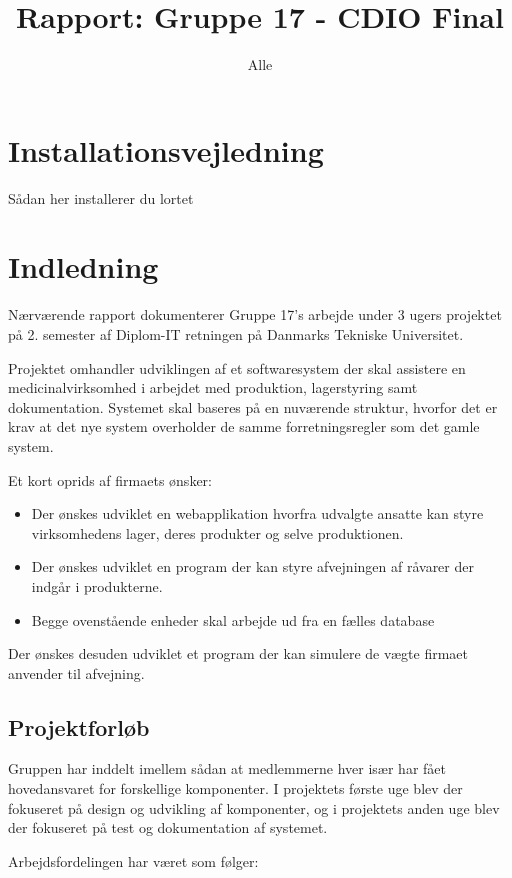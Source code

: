 \documentclass[a4paper]{article}
\title{Rapport: Gruppe 17 - CDIO Final}
\author{
  Alle
}
\begin{document}
\section*{Installationsvejledning} %

Sådan her installerer du lortet


\tableofcontents
\clearpage

\section{Indledning} %

Nærværende rapport dokumenterer Gruppe 17's arbejde under 3 ugers projektet på 2. semester af Diplom-IT retningen på Danmarks Tekniske Universitet.

Projektet omhandler udviklingen af et softwaresystem der skal assistere en medicinalvirksomhed i arbejdet med produktion, lagerstyring samt dokumentation. Systemet skal baseres på en nuværende struktur, hvorfor det er krav at det nye system overholder de samme forretningsregler som det gamle system.

Et kort oprids af firmaets ønsker:
\begin{itemize}
  \item Der ønskes udviklet en webapplikation hvorfra udvalgte ansatte kan styre virksomhedens lager, deres produkter og selve produktionen.
  \item Der ønskes udviklet en program der kan styre afvejningen af råvarer der indgår i produkterne.
  \item Begge ovenstående enheder skal arbejde ud fra en fælles database
\end{itemize}
Der ønskes desuden udviklet et program der kan simulere de vægte firmaet anvender til afvejning.

\subsection{Projektforløb} %

Gruppen har inddelt imellem sådan at medlemmerne hver især har fået hovedansvaret for forskellige komponenter. I projektets første uge blev der fokuseret på design og udvikling af komponenter, og i projektets anden uge blev der fokuseret på test og dokumentation af systemet.

Arbejdsfordelingen har været som følger:
\end{document}
